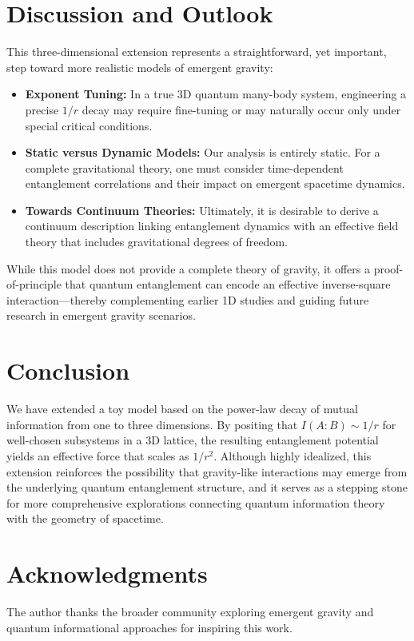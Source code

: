 \documentclass[12pt]{article}
\begin{document}
\section{Discussion and Outlook}
This three-dimensional extension represents a straightforward, yet important, step toward more realistic models of emergent gravity:
\begin{itemize}
    \item \textbf{Exponent Tuning:} In a true 3D quantum many-body system, engineering a precise $1/r$ decay may require fine-tuning or may naturally occur only under special critical conditions.
    \item \textbf{Static versus Dynamic Models:} Our analysis is entirely static. For a complete gravitational theory, one must consider time-dependent entanglement correlations and their impact on emergent spacetime dynamics.
    \item \textbf{Towards Continuum Theories:} Ultimately, it is desirable to derive a continuum description linking entanglement dynamics with an effective field theory that includes gravitational degrees of freedom.
\end{itemize}
While this model does not provide a complete theory of gravity, it offers a proof-of-principle that quantum entanglement can encode an effective inverse-square interaction—thereby complementing earlier 1D studies and guiding future research in emergent gravity scenarios.

\section{Conclusion}
We have extended a toy model based on the power-law decay of mutual information from one to three dimensions. By positing that $I(A:B) \sim 1/r$ for well-chosen subsystems in a 3D lattice, the resulting entanglement potential yields an effective force that scales as $1/r^2$. Although highly idealized, this extension reinforces the possibility that gravity-like interactions may emerge from the underlying quantum entanglement structure, and it serves as a stepping stone for more comprehensive explorations connecting quantum information theory with the geometry of spacetime.

\section*{Acknowledgments}
The author thanks the broader community exploring emergent gravity and quantum informational approaches for inspiring this work.
\end{document}
